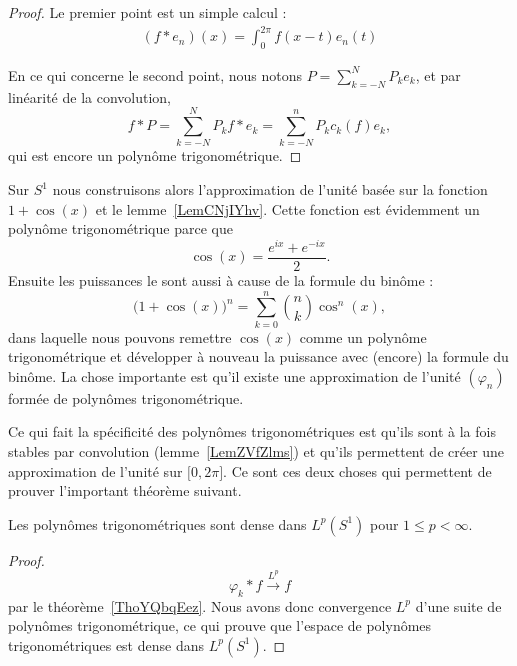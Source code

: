 \begin{proof}
	Le premier point est un simple calcul :
	\begin{subequations}
		\begin{align}
			(f*e_n)(x)=\int_0^{2\pi}f(x-t)e_n(t)
		\end{align}
	\end{subequations}

	En ce qui concerne le second point, nous notons \( P=\sum_{k=-N}^NP_ke_k\), et par linéarité de la convolution,
	\begin{equation}
		f*P=\sum_{k=-N}^NP_kf*e_k=\sum_{k=-N}^nP_kc_k(f)e_k,
	\end{equation}
	qui est encore un polynôme trigonométrique.
\end{proof}

\begin{example} \label{ExDMnVSWF}
	Sur \( S^1\) nous construisons alors l'approximation de l'unité basée sur la fonction \( 1+\cos(x)\) et le lemme~\ref{LemCNjIYhv}. Cette fonction est évidemment un polynôme trigonométrique parce que
	\begin{equation}
		\cos(x)=\frac{  e^{ix}+ e^{-ix} }{2}.
	\end{equation}
	Ensuite les puissances le sont aussi à cause de la formule du binôme :
	\begin{equation}
		\big( 1+\cos(x) \big)^n=\sum_{k=0}^n\binom{ n }{ k }\cos^n(x),
	\end{equation}
	dans laquelle nous pouvons remettre \( \cos(x)\) comme un polynôme trigonométrique et développer à nouveau la puissance avec (encore) la formule du binôme. La chose importante est qu'il existe une approximation de l'unité \( (\varphi_n)\) formée de polynômes trigonométrique.

	Ce qui fait la spécificité des polynômes trigonométriques est qu'ils sont à la fois stables par convolution (lemme~\ref{LemZVfZlms}) et qu'ils permettent de créer une approximation de l'unité sur \( \mathopen[ 0 , 2\pi \mathclose]\). Ce sont ces deux choses qui permettent de prouver l'important théorème suivant.
\end{example}

\begin{theorem} \label{ThoQGPSSJq}
	Les polynômes trigonométriques sont dense dans \( L^p(S^1)\) pour \( 1\leq p<\infty\).
\end{theorem}

\begin{proof}

	\begin{equation}
		\varphi_k*f\stackrel{L^p}{\to}f
	\end{equation}
	par le théorème~\ref{ThoYQbqEez}. Nous avons donc convergence \( L^p\) d'une suite de polynômes trigonométrique, ce qui prouve que l'espace de polynômes trigonométriques est dense dans \( L^p(S^1)\).
\end{proof}

